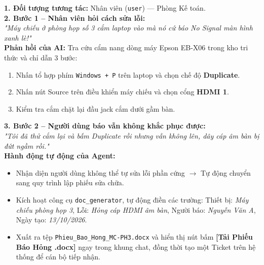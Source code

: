 \documentclass[11pt,a4paper]{article}
\begin{document}
\begin{scenariobox}
\textbf{1. Đối tượng tương tác:} Nhân viên (\texttt{user}) — Phòng Kế toán.\\
\textbf{2. Bước 1 -- Nhân viên hỏi cách sửa lỗi:}\\
\textit{"Máy chiếu ở phòng họp số 3 cắm laptop vào mà nó cứ báo No Signal màn hình xanh lè!"}\\
\textbf{Phản hồi của AI:} Tra cứu cẩm nang dòng máy Epson EB-X06 trong kho tri thức và chỉ dẫn 3 bước:
\begin{enumerate}[leftmargin=1.2em, itemsep=1pt]
    \item Nhấn tổ hợp phím \texttt{Windows + P} trên laptop và chọn chế độ \textbf{Duplicate}.
    \item Nhấn nút Source trên điều khiển máy chiếu và chọn cổng \textbf{HDMI 1}.
    \item Kiểm tra cắm chặt lại đầu jack cắm dưới gầm bàn.
\end{enumerate}
\textbf{3. Bước 2 -- Người dùng báo vẫn không khắc phục được:}\\
\textit{"Tôi đã thử cắm lại và bấm Duplicate rồi nhưng vẫn không lên, dây cáp âm bàn bị đứt ngầm rồi."}\\
\textbf{Hành động tự động của Agent:}
\begin{itemize}[leftmargin=1.2em, itemsep=2pt]
    \item Nhận diện người dùng không thể tự sửa lỗi phần cứng $\rightarrow$ Tự động chuyển sang quy trình lập phiếu sửa chữa.
    \item Kích hoạt công cụ \texttt{doc\_generator}, tự động điền các trường: Thiết bị: \textit{Máy chiếu phòng họp 3}, Lỗi: \textit{Hỏng cáp HDMI âm bàn}, Người báo: \textit{Nguyễn Văn A}, Ngày tạo: \textit{13/10/2026}.
    \item Xuất ra tệp \texttt{Phieu\_Bao\_Hong\_MC-PH3.docx} và hiển thị nút bấm \textbf{[Tải Phiếu Báo Hỏng .docx]} ngay trong khung chat, đồng thời tạo một Ticket trên hệ thống để cán bộ tiếp nhận.
\end{itemize}
\end{scenariobox}
\end{document}
